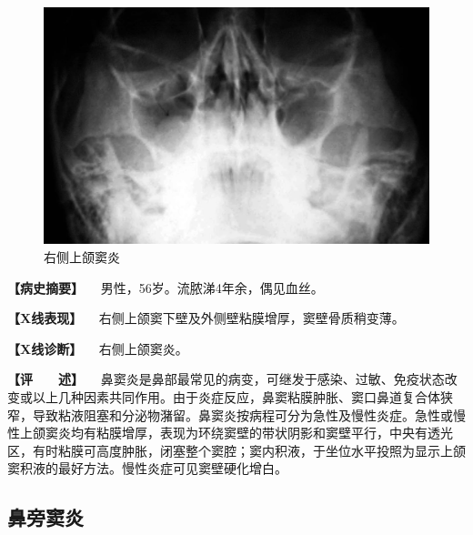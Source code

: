 \begin{figure}[!htbp]
 \centering
 \includegraphics{./images/Image00429.jpg}
 \captionsetup{justification=centering}
 \caption{右侧上颌窦炎}
 \label{fig7-4-3}
  \end{figure} 

\textbf{【病史摘要】} 　男性，56岁。流脓涕4年余，偶见血丝。

\textbf{【X线表现】} 　右侧上颌窦下壁及外侧壁粘膜增厚，窦壁骨质稍变薄。

\textbf{【X线诊断】} 　右侧上颌窦炎。

\textbf{【评　　述】}
　鼻窦炎是鼻部最常见的病变，可继发于感染、过敏、免疫状态改变或以上几种因素共同作用。由于炎症反应，鼻窦粘膜肿胀、窦口鼻道复合体狭窄，导致粘液阻塞和分泌物潴留。鼻窦炎按病程可分为急性及慢性炎症。急性或慢性上颌窦炎均有粘膜增厚，表现为环绕窦壁的带状阴影和窦壁平行，中央有透光区，有时粘膜可高度肿胀，闭塞整个窦腔；窦内积液，于坐位水平投照为显示上颌窦积液的最好方法。慢性炎症可见窦壁硬化增白。

\subsection{鼻旁窦炎}

